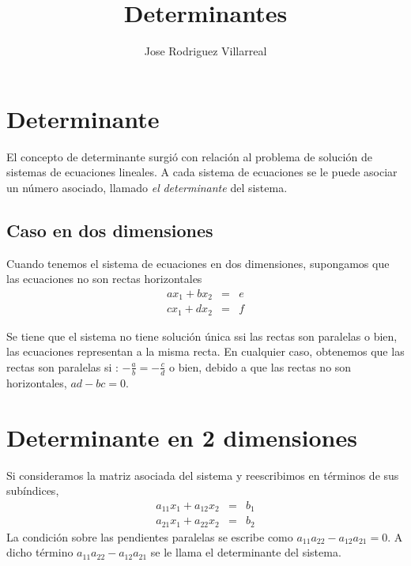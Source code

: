 \documentclass[
]{article}
\title{Determinantes}
\author{Jose Rodriguez Villarreal}
\date{}
\begin{document}
\maketitle

\hypertarget{determinante}{%
\section{Determinante}\label{determinante}}

\small

El concepto de determinante surgió con relación al problema de solución
de sistemas de ecuaciones lineales. A cada sistema de ecuaciones se le
puede asociar un número asociado, llamado \emph{el} \emph{determinante}
del sistema.

\hypertarget{caso-en-dos-dimensiones}{%
\subsection{Caso en dos dimensiones}\label{caso-en-dos-dimensiones}}

Cuando tenemos el sistema de ecuaciones en dos dimensiones, supongamos
que las ecuaciones no son rectas horizontales \[
 \begin{array}{ccc}
 a x_1 + b x_2  & = & e\\
 c x_1 + d x_2  & = & f
 \end{array}
\]

Se tiene que el sistema no tiene solución única ssi las rectas son
paralelas o bien, las ecuaciones representan a la misma recta. En
cualquier caso, obtenemos que las rectas son paralelas si :
\(-\frac{a}{b} = -\frac{c}{d}\) o bien, debido a que las rectas no son
horizontales, \(ad-bc=0\).

\hypertarget{determinante-en-2-dimensiones}{%
\section{Determinante en 2
dimensiones}\label{determinante-en-2-dimensiones}}

\tiny

Si consideramos la matriz asociada del sistema y reescribimos en
términos de sus subíndices, \[
 \begin{array}{ccc}
 a_{11} x_1 + a_{12} x_2  & = & b_1\\
 a_{21} x_1 + a_{22} x_2  & = & b_2
 \end{array}
\] La condición sobre las pendientes paralelas se escribe como
\(a_{11}a_{22}-a_{12}a_{21}=0\). A dicho término
\(a_{11}a_{22}-a_{12}a_{21}\) se le llama el determinante del sistema.
\end{document}
